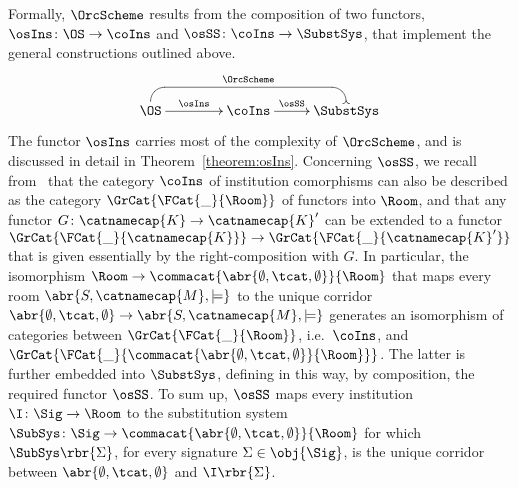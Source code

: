 \documentclass{LMCS}
\begin{document}
  Formally, \(\OrcScheme\) results from the composition of two functors, \(\osIns \colon \OS \to \coIns\) and \(\osSS \colon \coIns \to \SubstSys\), that implement the general constructions outlined above.
  \[
  \xymatrix @C+=7em @!0 {
    {\OS}
    \ar [r] ^-{\osIns}
    \ar @{-<} `u[rr] `[rr] ^-{\OrcScheme} [rr]
    & {\coIns}
    \ar [r] ^-{\osSS}
    & {\SubstSys}
  }
  \]
  The functor \(\osIns\) carries most of the complexity of \(\OrcScheme\), and is discussed in detail in Theorem~\ref{theorem:osIns}.
  Concerning \(\osSS\), we recall from~\cite{Tutu-Fiadeiro:Institution-independent-logic-programming-2015} that the category \(\coIns\) of institution comorphisms can also be described as the category \(\GrCat{\FCat{\_}{\Room}}\) of functors into \(\Room\), and that any functor \(G \colon \catnamecap{K} \to \catnamecap{K}'\) can be extended to a functor \(\GrCat{\FCat{\_}{\catnamecap{K}}} \to \GrCat{\FCat{\_}{\catnamecap{K}'}}\) that is given essentially by the right-composition with \(G\).
  In particular, the isomorphism \(\Room \to \commacat{\abr{\emptyset, \tcat, \emptyset}}{\Room}\) that maps every room \(\abr{S, \catnamecap{M}, \models}\) to the unique corridor \(\abr{\emptyset, \tcat, \emptyset} \to \abr{S, \catnamecap{M}, \models}\) generates an isomorphism of categories between \(\GrCat{\FCat{\_}{\Room}}\), i.e.\ \(\coIns\), and \(\GrCat{\FCat{\_}{\commacat{\abr{\emptyset, \tcat, \emptyset}}{\Room}}}\).  The latter is further embedded into \(\SubstSys\), defining in this way, by composition, the required functor \(\osSS\).
  To sum up, \(\osSS\) maps every institution \(\I \colon \Sig \to \Room\) to the substitution system \(\SubSys \colon \Sig \to \commacat{\abr{\emptyset, \tcat, \emptyset}}{\Room}\) for which \(\SubSys\rbr{\Sigma}\), for every signature \(\Sigma \in \obj{\Sig}\), is the unique corridor between \(\abr{\emptyset, \tcat, \emptyset}\) and \(\I\rbr{\Sigma}\).
\end{document}
